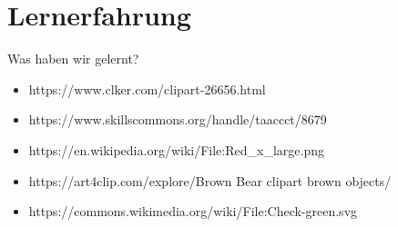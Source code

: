 \documentclass[xcolor=dvipsnames]{beamer}
\begin{document}
    \section{Lernerfahrung}
    \begin{frame}
        \begin{center}
            \Huge Was haben wir gelernt?
        \end{center}
    \end{frame}
    \begin{frame}[plain]
        \begin{itemize}
            \item https://www.clker.com/clipart-26656.html \\
            \item https://www.skillscommons.org/handle/taaccct/8679 \\
            \item https://en.wikipedia.org/wiki/File:Red\_x\_large.png \\
            \item https://art4clip.com/explore/Brown Bear clipart brown objects/ \\
            \item https://commons.wikimedia.org/wiki/File:Check-green.svg \\ %
        \end{itemize}
    \end{frame}
\end{document}

